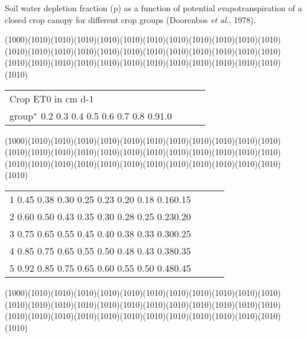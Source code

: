\begin{indenting}{2.54cm}
Soil water depletion fraction (p) as a function of potential evapotranspira\-tion of a closed crop canopy for different crop groups (Doorenbos {\it et al\/}.,
1978).
\end{indenting}
\GrBox(1000)\GrBox(1010)\GrBox(1010)\GrBox(1010)\GrBox(1010)\GrBox(1010)\GrBox(1010)\GrBox(1010)\GrBox(1010)\GrBox(1010)\GrBox(1010)\GrBox(1010)\GrBox(1010)\GrBox(1010)\GrBox(1010)\GrBox(1010)\GrBox(1010)\GrBox(1010)\GrBox(1010)\GrBox(1010)\GrBox(1010)\GrBox(1010)\GrBox(1010)\GrBox(1010)\GrBox(1010)\GrBox(1010)\GrBox(1010)\GrBox(1010)\GrBox(1010)\GrBox(1010)\GrBox(1010)\GrBox(1010)\GrBox(1010)\GrBox(1010)\GrBox(1010)\GrBox(1010)\GrBox(1010)\-\nwln
\begin{tabularx}{\textwidth}{llXr}



Crop   ET0 in cm d-1\\
group$^{{\rm *}}$   0.2 0.3 0.4 0.5 0.6 0.7 0.8 0.91.0
\end{tabularx}
\GrBox(1000)\GrBox(1010)\GrBox(1010)\GrBox(1010)\GrBox(1010)\GrBox(1010)\GrBox(1010)\GrBox(1010)\GrBox(1010)\GrBox(1010)\GrBox(1010)\GrBox(1010)\GrBox(1010)\GrBox(1010)\GrBox(1010)\GrBox(1010)\GrBox(1010)\GrBox(1010)\GrBox(1010)\GrBox(1010)\GrBox(1010)\GrBox(1010)\GrBox(1010)\GrBox(1010)\GrBox(1010)\GrBox(1010)\GrBox(1010)\GrBox(1010)\GrBox(1010)\GrBox(1010)\GrBox(1010)\GrBox(1010)\GrBox(1010)\GrBox(1010)\GrBox(1010)\GrBox(1010)\GrBox(1010)\-\nwln
\begin{tabularx}{\textwidth}{llXr}



1   0.45 0.38 0.30 0.25 0.23 0.20 0.18 0.160.15\\
2   0.60 0.50 0.43 0.35 0.30 0.28 0.25 0.230.20\\
3   0.75 0.65 0.55 0.45 0.40 0.38 0.33 0.300.25\\
4   0.85 0.75 0.65 0.55 0.50 0.48 0.43 0.380.35\\
5   0.92 0.85 0.75 0.65 0.60 0.55 0.50 0.480.45
\end{tabularx}
\GrBox(1000)\GrBox(1010)\GrBox(1010)\GrBox(1010)\GrBox(1010)\GrBox(1010)\GrBox(1010)\GrBox(1010)\GrBox(1010)\GrBox(1010)\GrBox(1010)\GrBox(1010)\GrBox(1010)\GrBox(1010)\GrBox(1010)\GrBox(1010)\GrBox(1010)\GrBox(1010)\GrBox(1010)\GrBox(1010)\GrBox(1010)\GrBox(1010)\GrBox(1010)\GrBox(1010)\GrBox(1010)\GrBox(1010)\GrBox(1010)\GrBox(1010)\GrBox(1010)\GrBox(1010)\GrBox(1010)\GrBox(1010)\GrBox(1010)\GrBox(1010)\GrBox(1010)\GrBox(1010)\GrBox(1010)\-


